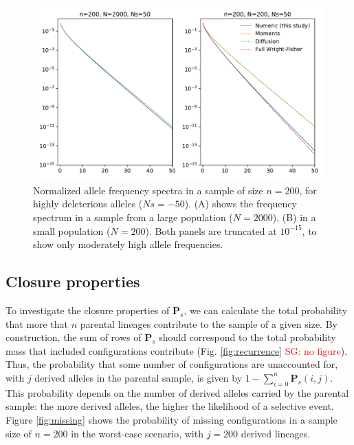 \documentclass[review]{elsarticle}
\newcommand{\sgcomment}[1]{\textcolor{red}{SG: #1}}
\begin{document}
\begin{figure}
  \centering
  \includegraphics[width=0.7\textheight]{fig/strong_selection.pdf}
  \caption{Normalized allele frequency spectra in a sample of size $n=200$, for highly deleterious
    alleles ($Ns=-50$). (A) shows the frequency spectrum in a sample from a large population
    ($N=2000$), (B) in a small population ($N=200$). Both panels are truncated at $10^{-15}$, to
    show only moderately high allele frequencies.}
  \label{fig:strong-selection}
\end{figure}


\subsection{Closure properties}
\label{subsec:closure}

To investigate the closure properties of $\mathbf{P}_s$, we can calculate the total probability that
more that $n$ parental lineages contribute to the sample of a given size. By construction, the sum
of rows of $\mathbf{P}_s$ should correspond to the total probability mass that included
configurations contribute (Fig. \ref{fig:recurrence} \sgcomment{no figure}). Thus, the probability
that some number of configurations are unaccounted for, with $j$ derived alleles in the parental
sample, is given by $1-\sum_{i=0}^{n}\mathbf{P}_s(i,j)$. This probability depends on the number of derived
alleles carried by the parental sample: the more derived alleles, the higher the likelihood of a
selective event. Figure \ref{fig:missing} shows the probability of missing configurations in a
sample size of $n=200$ in the worst-case scenario, with $j=200$ derived lineages.
\end{document}
